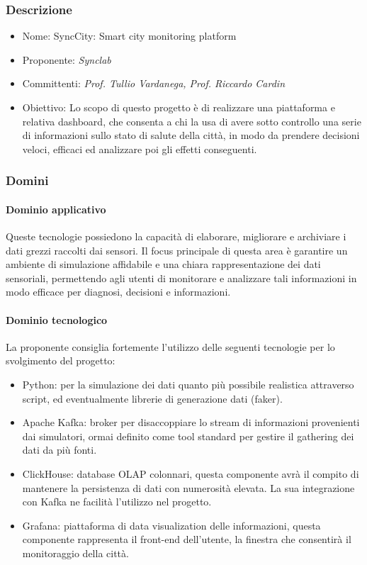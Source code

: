 \documentclass[italian,12pt]{article} %
\begin{document}
\subsubsection{Descrizione}
\begin{itemize}
	\item Nome: SyncCity: Smart city monitoring platform
	\item Proponente: {\it Synclab}
	\item Committenti: {\it Prof. Tullio Vardanega, Prof. Riccardo Cardin}
	\item Obiettivo: Lo scopo di questo progetto è di realizzare una piattaforma e relativa dashboard, che consenta a chi la usa di avere sotto controllo una serie di informazioni sullo stato di salute della città, in modo da prendere decisioni veloci, efficaci ed analizzare poi gli effetti conseguenti.
\end{itemize}

\subsubsection{Domini}
\paragraph{Dominio applicativo}
Queste tecnologie possiedono la capacità di elaborare, migliorare e archiviare i dati grezzi raccolti dai sensori. Il focus principale di questa area è garantire un ambiente di simulazione affidabile e una chiara rappresentazione dei dati sensoriali, permettendo agli utenti di monitorare e analizzare tali informazioni in modo efficace per diagnosi, decisioni e informazioni.
\paragraph{Dominio tecnologico}
La proponente consiglia fortemente l'utilizzo delle seguenti tecnologie per lo svolgimento del progetto:
\begin{itemize}
	\item Python: per la simulazione dei dati quanto più possibile realistica attraverso script, ed eventualmente librerie di generazione dati (faker).
	\item Apache Kafka: broker per disaccoppiare lo stream di informazioni provenienti dai simulatori, ormai definito come tool standard per gestire il gathering dei dati da più fonti.
	\item ClickHouse: database OLAP colonnari, questa componente avrà il compito di mantenere la persistenza di dati con numerosità elevata. La sua integrazione con Kafka ne facilità l'utilizzo nel progetto.
	\item Grafana: piattaforma di data visualization delle informazioni, questa componente rappresenta il front-end dell'utente, la finestra che consentirà il monitoraggio della città.
\end{itemize}
\end{document}
